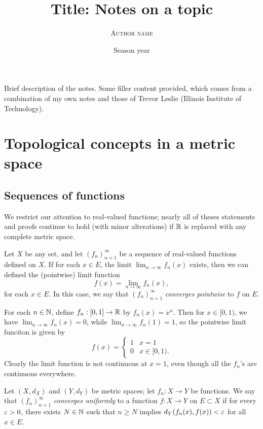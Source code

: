 \documentclass[12pt]{scrartcl} %
\title{Title: Notes on a topic}
\author{\textsc{Author name}}
\date{\normalsize{Season year}}
\begin{document}
\maketitle

Brief description of the notes. Some filler content provided, which comes from a combination of my own notes and those of Trevor Leslie (Illinois Institute of Technology).

\pagebreak

\tableofcontents

\pagebreak

\section{Topological concepts in a metric space}

\subsection{Sequences of functions}

We restrict our attention to real-valued functions; nearly all of theses statements and proofs continue to hold (with minor alterations) if $\mathbb{R}$ is replaced with any complete metric space.

\begin{definition}
    Let $X$ be any set, and let $(f_n)_{n=1}^{\infty}$ be a sequence of real-valued functions defined on $X$. If for each $x \in E$, the limit $\lim_{n \to \infty}f_n(x)$ exists, then we can defined the (pointwise) limit function \[f(x) = \lim_{n \to \infty}f_n(x),\] for each $x \in E$. In this case, we say that $(f_n)_{n=1}^{\infty}$ \textit{converges pointwise} to $f$ on $E$.
\end{definition}

\begin{example}
    For each $n \in \mathbb{N}$, define $f_n : [0,1] \to \mathbb{R}$ by $f_n(x) = x^n$. Then for $x \in [0,1)$, we have $\lim_{n\to \infty}f_n(x) = 0$, while $\lim_{n \to \infty}f_n(1) = 1$, so the pointwise limit funciton is given by \[f(x) = \begin{cases}
        1 &x=1\\
        0 &x \in [0, 1).
    \end{cases}\] Clearly the limit function is not continuous at $x = 1$, even though all the $f_n$'s are continuous everywhere.
\end{example}

\begin{definition}
    Let $(X, d_X)$ and $(Y, d_Y)$ be metric spaces; let $f_n : X \to Y$ be functions. We say that $(f_n)_{n=1}^{\infty}$ \textit{converges uniformly} to a function $f: X \to Y$ on $E \subset X$ if for every $\varepsilon > 0$, there exists $N \in \mathbb{N}$ such that $n \geq N$ implies $d_Y(f_n(x), f(x)) < \varepsilon$ for all $x \in E$.
\end{definition}
\end{document}
